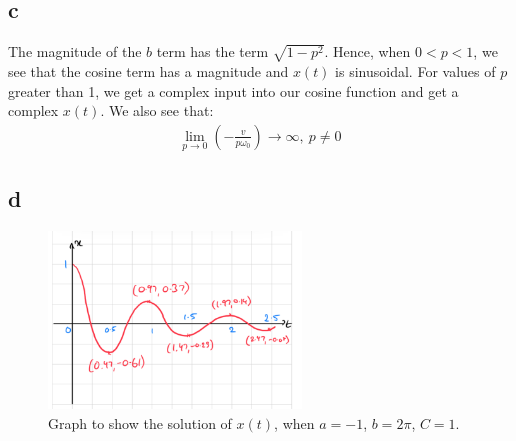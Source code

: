 \documentclass[11pt]{article}
\numberwithin{equation}{section}
\begin{document}
\subsection*{c}
The magnitude of the $b$ term has the term $\sqrt{1-p^2}$. Hence, when $0< p < 1$, we see that the cosine term has a magnitude and $x(t)$ is sinusoidal. For values of $p$ greater than 1, we get a complex input into our cosine function and get a complex $x(t)$. We also see that:
\begin{align}
  \lim_{p\rightarrow 0} \left(-\frac{v}{p\omega_0}\right) \rightarrow \infty, \ p \neq 0
\end{align}
\subsection*{d}
\begin{figure}[H]
  \centerline{\includegraphics[width = 0.6\textwidth]{q1d.png}}
  \caption{Graph to show the solution of $x(t)$, when $a = -1$, $b = 2\pi$, $C=1$.}
\end{figure}
\end{document}

